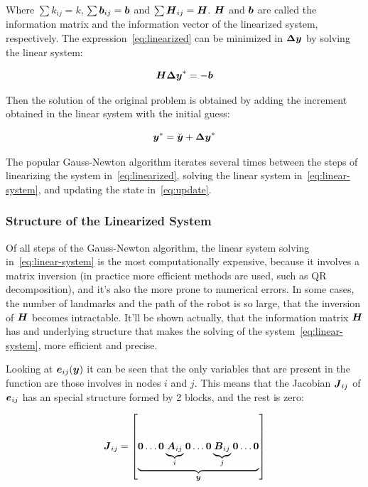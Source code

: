 Where $\sum k_{ij} = k$, $\sum \boldsymbol{b}_{ij} = \boldsymbol{b}$ and $\sum \boldsymbol{H}_{ij} = \boldsymbol{H}$. $\boldsymbol{H}$ and $\boldsymbol{b}$ are called the information matrix and the information vector of the linearized system, respectively. The expression~\eqref{eq:linearized} can be minimized in $\boldsymbol{\Delta y}$ by solving the linear system:

\begin{equation}
\boldsymbol{H \Delta y}^* = -\boldsymbol{b}
\label{eq:linear-system}
\end{equation}

Then the solution of the original problem is obtained by adding the increment obtained in the linear system with the initial guess:

\begin{equation}
\boldsymbol{y}^* = \breve{\boldsymbol{y}}+ \boldsymbol{\Delta y}^*
\label{eq:update}
\end{equation}

The popular Gauss-Newton algorithm iterates several times between the steps of linearizing the system in~\eqref{eq:linearized}, solving the linear system in~\eqref{eq:linear-system}, and updating the state in~\eqref{eq:update}.  

\subsubsection{Structure of the Linearized System}

Of all steps of the Gauss-Newton algorithm, the linear system solving in~\eqref{eq:linear-system} is the most computationally expensive, because it involves a matrix inversion (in practice more efficient methods are used, such as QR decomposition), and it's also the more prone to numerical errors. In some cases, the number of landmarks and the path of the robot is so large, that the inversion of $\boldsymbol{H}$ becomes intractable. It'll be shown actually, that the information matrix $\boldsymbol{H}$ has and underlying structure that makes the solving of the system~\eqref{eq:linear-system}, more efficient and precise.


Looking at $\boldsymbol{e}_{ij}(\boldsymbol{y})$ it can be seen that the only variables that are present in the function are those involves in nodes $i$ and $j$. This means that the Jacobian $\boldsymbol{J}_{ij}$ of $\boldsymbol{e}_{ij}$ has an special structure formed by 2 blocks, and the rest is zero:

\begin{equation}
\boldsymbol{J}_{ij} = \left[ \underbrace{\boldsymbol{0} \dots \boldsymbol{0} 
    \underbrace{\boldsymbol{A}_{ij}}_{i} \boldsymbol{0} \dots \boldsymbol{0} 
    \underbrace{\boldsymbol{B}_{ij}}_{j}
    \boldsymbol{0} \dots \boldsymbol{0}}_{\boldsymbol{y}} \right] 
\end{equation}

